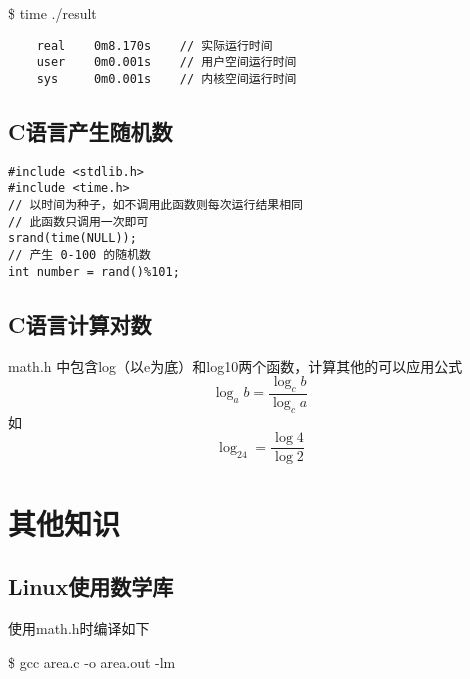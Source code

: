 \begin{spacing}{1.2}
\qquad \$ time ./result

\begin{lstlisting}
    real	0m8.170s    // 实际运行时间
    user	0m0.001s    // 用户空间运行时间
    sys	    0m0.001s    // 内核空间运行时间
\end{lstlisting}

\subsection{C语言产生随机数}
\begin{lstlisting}
#include <stdlib.h>
#include <time.h>
// 以时间为种子，如不调用此函数则每次运行结果相同
// 此函数只调用一次即可 
srand(time(NULL));
// 产生 0-100 的随机数
int number = rand()%101;
\end{lstlisting}

\subsection{C语言计算对数}
math.h 中包含log（以e为底）和log10两个函数，计算其他的可以应用公式
\[
    \log _ab = \frac{\log _cb}{\log _ca}
\]
如
\[
    \log _24 = \frac{\log 4}{\log 2}
\]

    \section{其他知识}
    \subsection{Linux使用数学库}
    使用math.h时编译如下

    \qquad \$ gcc area.c -o area.out  -lm

\end{spacing}


